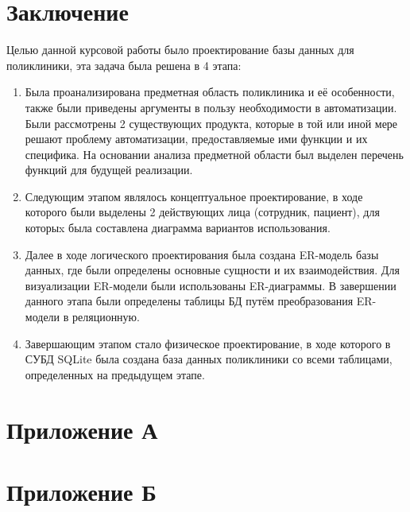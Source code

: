 \documentclass[14pt,a4paper,russian]{extreport}
\begin{document}
\chapter*{Заключение}
Целью данной курсовой работы было проектирование базы данных для поликлиники, эта задача
была решена в 4 этапа:
\begin{enumerate}[noitemsep]
    \item Была проанализирована предметная область поликлиника и её особенности, также были
        приведены аргументы в пользу необходимости в автоматизации. Были рассмотрены 2 существующих
        продукта, которые в той или иной мере решают проблему автоматизации, предоставляемые ими
        функции и их специфика. На основании анализа предметной области был выделен перечень
        функций для будущей реализации.
    \item Следующим этапом являлось концептуальное проектирование, в ходе которого были выделены 2
        действующих лица (сотрудник, пациент), для которыx была составлена
        диаграмма вариантов использования.
    \item Далее в ходе логического проектирования была создана ER-модель базы данных, где были
        определены основные сущности и их взаимодействия. Для визуализации ER-модели были
        использованы ER-диаграммы. В завершении данного этапа были определены таблицы БД путём
        преобразования ER-модели в реляционную.
    \item Завершающим этапом стало физическое проектирование, в ходе которого в СУБД SQLite была
        создана база данных поликлиники со всеми таблицами, определенных на предыдущем этапе.
\end{enumerate}

{}

\chapter*{Приложение А}
\setcounter{lstlisting}{0}















\chapter*{Приложение Б}
\end{document}
